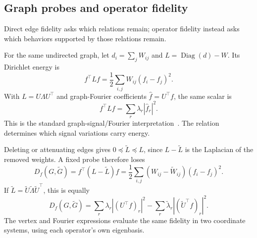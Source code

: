 \subsection{Graph probes and operator fidelity}
\label{sec:graph-fourier-distortion}

Direct edge fidelity asks which relations remain; operator fidelity instead asks which behaviors supported by those relations remain.

For the same undirected graph, let $d_i=\sum_jW_{ij}$ and $L=\operatorname{Diag}(d)-W$.
Its Dirichlet energy is
\begin{equation}
f^\top Lf=\frac12\sum_{i,j}W_{ij}(f_i-f_j)^2.
\label{eq:dirichlet-energy-vertex}
\end{equation}
With $L=U\Lambda U^\top$ and graph-Fourier coefficients $\widehat f=U^\top f$, the same scalar is
\begin{equation}
f^\top Lf=\sum_r\lambda_r|\widehat f_r|^2.
\label{eq:dirichlet-energy-fourier}
\end{equation}
This is the standard graph-signal/Fourier interpretation~\citep{shuman2013emerging}.
The relation determines which signal variations carry energy.

Deleting or attenuating edges gives $0\preceq\widetilde L\preceq L$, since $L-\widetilde L$ is the Laplacian of the removed weights.
A fixed probe therefore loses
\begin{equation}
D_f(G,\widetilde G)
=f^\top(L-\widetilde L)f
=\frac12\sum_{i,j}(W_{ij}-\widetilde W_{ij})(f_i-f_j)^2.
\label{eq:dirichlet-distortion-vertex}
\end{equation}
If $\widetilde L=\widetilde U\widetilde\Lambda\widetilde U^\top$, this is equally
\begin{equation}
D_f(G,\widetilde G)
=\sum_r\lambda_r|(U^\top f)_r|^2
-\sum_r\widetilde\lambda_r|(\widetilde U^\top f)_r|^2.
\label{eq:dirichlet-distortion-fourier}
\end{equation}
The vertex and Fourier expressions evaluate the same fidelity in two coordinate systems, using each operator's own eigenbasis.

